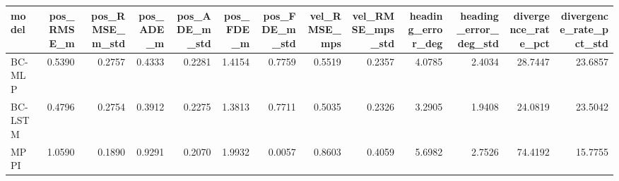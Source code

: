 \begin{tabular}{lrrrrrrrrrrrr}
\toprule
model & pos_RMSE_m & pos_RMSE_m_std & pos_ADE_m & pos_ADE_m_std & pos_FDE_m & pos_FDE_m_std & vel_RMSE_mps & vel_RMSE_mps_std & heading_error_deg & heading_error_deg_std & divergence_rate_pct & divergence_rate_pct_std \\
\midrule
BC-MLP & 0.5390 & 0.2757 & 0.4333 & 0.2281 & 1.4154 & 0.7759 & 0.5519 & 0.2357 & 4.0785 & 2.4034 & 28.7447 & 23.6857 \\
BC-LSTM & 0.4796 & 0.2754 & 0.3912 & 0.2275 & 1.3813 & 0.7711 & 0.5035 & 0.2326 & 3.2905 & 1.9408 & 24.0819 & 23.5042 \\
MPPI & 1.0590 & 0.1890 & 0.9291 & 0.2070 & 1.9932 & 0.0057 & 0.8603 & 0.4059 & 5.6982 & 2.7526 & 74.4192 & 15.7755 \\
\bottomrule
\end{tabular}
